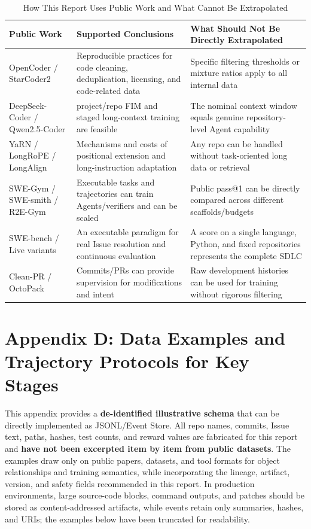 \documentclass[10pt,a4paper,UTF8,fontset=none]{ctexart}
\begin{document}
\begin{table}[htbp]
\centering
\caption{How This Report Uses Public Work and What Cannot Be Extrapolated}
\label{en:tab:evidence-boundary}
\small
\begin{tabularx}{\textwidth}{p{3.0cm}YY}
\toprule
Public Work & Supported Conclusions & What Should Not Be Directly Extrapolated \\
\midrule
OpenCoder / StarCoder2 & Reproducible practices for code cleaning, deduplication, licensing, and code-related data & Specific filtering thresholds or mixture ratios apply to all internal data \\
DeepSeek-Coder / Qwen2.5-Coder & project/repo FIM and staged long-context training are feasible & The nominal context window equals genuine repository-level Agent capability \\
YaRN / LongRoPE / LongAlign & Mechanisms and costs of positional extension and long-instruction adaptation & Any repo can be handled without task-oriented long data or retrieval \\
SWE-Gym / SWE-smith / R2E-Gym & Executable tasks and trajectories can train Agents/verifiers and can be scaled & Public pass@1 can be directly compared across different scaffolds/budgets \\
SWE-bench / Live variants & An executable paradigm for real Issue resolution and continuous evaluation & A score on a single language, Python, and fixed repositories represents the complete SDLC \\
Clean-PR / OctoPack & Commits/PRs can provide supervision for modifications and intent & Raw development histories can be used for training without rigorous filtering \\
\bottomrule
\end{tabularx}
\end{table}

\section{Appendix D: Data Examples and Trajectory Protocols for Key Stages}

This appendix provides a \textbf{de-identified illustrative schema} that can be directly implemented as JSONL/Event Store. All repo names, commits, Issue text, paths, hashes, test counts, and reward values are fabricated for this report and \textbf{have not been excerpted item by item from public datasets}. The examples draw only on public papers, datasets, and tool formats for object relationships and training semantics, while incorporating the lineage, artifact, version, and safety fields recommended in this report. In production environments, large source-code blocks, command outputs, and patches should be stored as content-addressed artifacts, while events retain only summaries, hashes, and URIs; the examples below have been truncated for readability.
\end{document}
